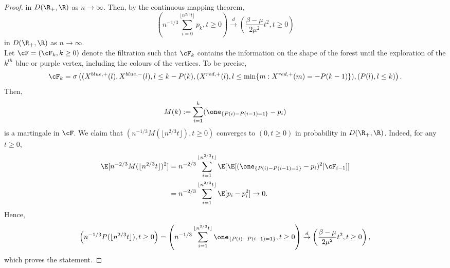 \begin{proof}
in $D(\R_+,\R)$ as $n\to \infty$. 
Then, by the continuous mapping theorem,
$$\left(n^{-1/3}\sum_{i=0}^{\lfloor n^{2/3}t \rfloor} p_k , t \geq 0\right)\overset{d}{\to} \left(\frac{\beta-\mu}{2\mu^2}t^2,t\geq 0\right)$$
in $D(\R_+,\R)$ as $n\to \infty$. \\
Let $\cF=(\cF_k,k\geq 0)$ denote the filtration such that $\cF_{k}$ contains the information on the shape of the forest until the exploration of the $k^{th}$ blue or purple vertex, including the colours of the vertices. To be precise,
$$\cF_k=\sigma\left((X^{blue,+}(l),X^{blue,-}(l), l\leq k-P(k),(X^{red,+}(l),l\leq \min\{m:X^{red,+}(m)=-P(k-1)\}), (P(l),l\leq k)\right).$$ Then, 
$$M(k):=\sum_{i=1}^k (\one_{\{P(i)-P(i-1)=1\}}-p_i)$$ is a martingale in $\cF$. We claim that $(n^{-1/3}M(\lfloor n^{2/3} t\rfloor ), t\geq 0)$ converges to $(0,t\geq 0)$ in probability in $D(\R_+,\R)$. Indeed, for any $t\geq 0$,
\begin{align*}\E[n^{-2/3}M(\lfloor n^{2/3} t\rfloor )^2]&=n^{-2/3}\sum_{i=1}^{\lfloor n^{2/3} t\rfloor} \E[\E[(\one_{\{P(i)-P(i-1)=1\}}-p_i)^2|\cF_{i-1}]]\\&=n^{-2/3}\sum_{i=1}^{\lfloor n^{2/3} t\rfloor} \E[p_i-p_i^2]\to 0.\end{align*}
Hence,
$$\left(n^{-1/3}P(\lfloor n^{2/3}t\rfloor), t\geq 0\right)=\left(n^{-1/3}\sum_{i=1}^{\lfloor n^{2/3}t\rfloor}  \one_{\{P(i)-P(i-1)=1\}}  , t\geq 0\right)\overset{d}{\to} \left(\frac{\beta - \mu}{2\mu^2} t^2, t\geq 0 \right),$$
 which proves the statement.

\end{proof}\\

